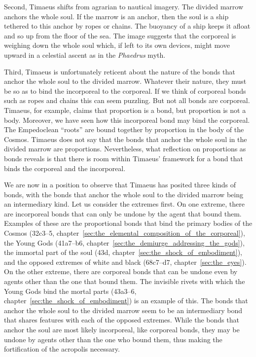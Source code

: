 Second, Timaeus shifts from agrarian to nautical imagery. The divided marrow anchors the whole soul. If the marrow is an anchor, then the soul is a ship tethered to this anchor by ropes or chains. The buoyancy of a ship keeps it afloat and so up from the floor of the sea. The image suggests that the corporeal is weighing down the whole soul which, if left to its own devices, might move upward in a celestial ascent as in the \emph{Phaedrus} myth.

Third, Timaeus is unfortunately reticent about the nature of the bonds that anchor the whole soul to the divided marrow. Whatever their nature, they must be so as to bind the incorporeal to the corporeal. If we think of corporeal bonds such as ropes and chains this can seem puzzling. But not all bonds are corporeal. Timaeus, for example, claims that proportion is a bond, but proportion is not a body. Moreover, we have seen how this incorporeal bond may bind the corporeal. The Empedoclean ``roots'' are bound together by proportion in the body of the Cosmos. Timaeus does not say that the bonds that anchor the whole soul in the divided marrow are proportions. Nevertheless, what reflection on proportions as bonds reveals is that there is room within Timaeus' framework for a bond that binds the corporeal and the incorporeal.

We are now in a position to observe that Timaeus has posited three kinds of bonds, with the bonds that anchor the whole soul to the divided marrow being an intermediary kind. Let us consider the extremes first. On one extreme, there are incorporeal bonds that can only be undone by the agent that bound them. Examples of these are the proportional bonds that bind the primary bodies of the Cosmos  (32c3--5, chapter~\ref{sec:the_elemental_composition_of_the_corporeal}), the Young Gods (41a7--b6, chapter~\ref{sec:the_demiurge_addressing_the_gods}), the immortal part of the soul (43d, chapter~\ref{sec:the_shock_of_embodiment}), and the opposed extremes of white and black (68c7–d7, chapter~\ref{sec:the_eyes}). On the other extreme, there are corporeal bonds that can be undone even by agents other than the one that bound them. The invisible rivets with which the Young Gods bind the mortal parts (43a3–6, chapter~\ref{sec:the_shock_of_embodiment}) is an example of this. The bonds that anchor the whole soul to the divided marrow seem to be an intermediary bond that shares features with each of the opposed extremes. While the bonds that anchor the soul are most likely incorporeal, like corporeal bonds, they may be undone by agents other than the one who bound them, thus making the fortification of the acropolis necessary.

